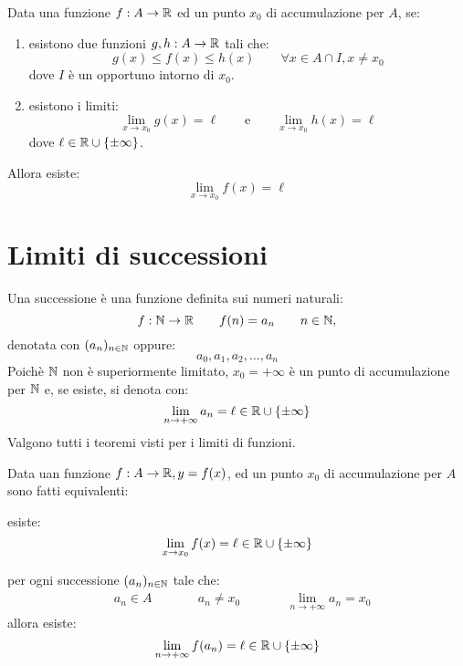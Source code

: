 \begin{teo}
Data una funzione $f:A\rightarrow\mathbb{R}$ ed un punto $x_0$ di accumulazione per $A$, se:
\begin{enumerate}
\item esistono due funzioni $g,h:A\rightarrow\mathbb{R}$ tali che:
\[g(x)\leq f(x)\leq h(x) \qquad \forall x\in A\cap I, x\neq x_0\]
dove $I$ è un opportuno intorno di $x_0$.
\item esistono i limiti:
\[\lim_{x\to x_0}{g(x)}=\ell \qquad \text{e} \qquad \lim_{x\to x_0}{h(x)}=\ell\]
dove $\ell \in \mathbb{R} \cup \{\pm\infty\}$.
\end{enumerate}
Allora esiste:
\[\lim_{x\to x_0}{f(x)}=\ell\]
\end{teo}

\section{Limiti di successioni}
Una successione è una funzione definita sui numeri naturali:
\[f:\mathbb{N}\rightarrow\mathbb{R} \qquad f(n)=a_n \qquad n\in\mathbb{N},\]
denotata con $(a_n)_{n\in\mathbb{N}}$ oppure:
\[a_0,a_1,a_2,\dots,a_n\]
Poichè $\mathbb{N}$ non è superiormente limitato, $x_0=+\infty$ è un punto di accumulazione per $\mathbb{N}$ e, se esiste, si denota con:
\[\lim_{n\to+\infty}{a_n}=\ell\in\mathbb{R}\cup\{\pm\infty\}\]
Valgono tutti i teoremi visti per i limiti di funzioni.

\begin{teo}
Data uan funzione $f:A\rightarrow\mathbb{R},y=f(x)$, ed un punto $x_0$ di accumulazione per $A$ sono fatti equivalenti:
\begin{aenumerate}
\item esiste:
\[\lim_{x\to x_0}{f(x)}=\ell\in\mathbb{R}\cup\{\pm\infty\}\]
\item per ogni successione $(a_n)_{n\in\mathbb{N}}$ tale che:
\begin{align*}
&a_n\in A & \qquad & a_n\neq x_0 & \qquad & \lim_{n\to+\infty}{a_n}=x_0
\end{align*}
allora esiste:
\[\lim_{n\to+\infty}{f(a_n)}=\ell\in\mathbb{R}\cup\{\pm\infty\}\]
\end{aenumerate}
\end{teo}

